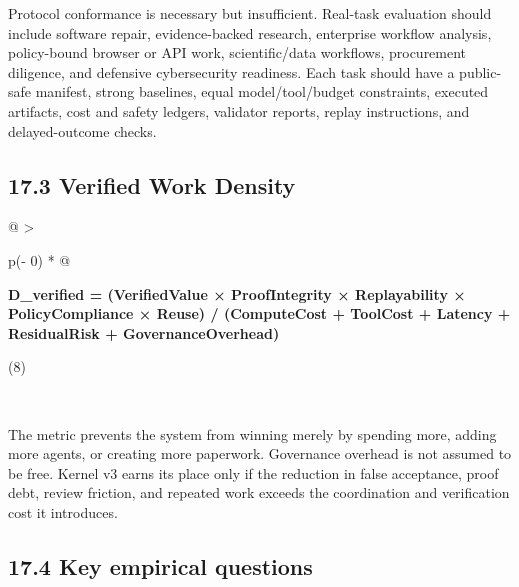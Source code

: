Protocol conformance is necessary but insufficient. Real-task evaluation
should include software repair, evidence-backed research, enterprise
workflow analysis, policy-bound browser or API work, scientific/data
workflows, procurement diligence, and defensive cybersecurity readiness.
Each task should have a public-safe manifest, strong baselines, equal
model/tool/budget constraints, executed artifacts, cost and safety
ledgers, validator reports, replay instructions, and delayed-outcome
checks.

\subsection{17.3 Verified Work Density}\label{verified-work-density}

\begin{longtable}[]{@{}
  >{\raggedright\arraybackslash}p{(\columnwidth - 0\tabcolsep) * }@{}}
\toprule\noalign{}
\begin{minipage}[b]{\linewidth}\raggedright
\textbf{D\_\allowbreak{}verified = (VerifiedValue × ProofIntegrity × Replayability ×
PolicyCompliance × Reuse) / (ComputeCost + ToolCost + Latency +
ResidualRisk + GovernanceOverhead)}

(8)
\end{minipage} \\
\midrule\noalign{}
\endhead
\bottomrule\noalign{}
\endlastfoot
\end{longtable}

The metric prevents the system from winning merely by spending more,
adding more agents, or creating more paperwork. Governance overhead is
not assumed to be free. Kernel v3 earns its place only if the reduction
in false acceptance, proof debt, review friction, and repeated work
exceeds the coordination and verification cost it introduces.

\subsection{17.4 Key empirical questions}\label{key-empirical-questions}

